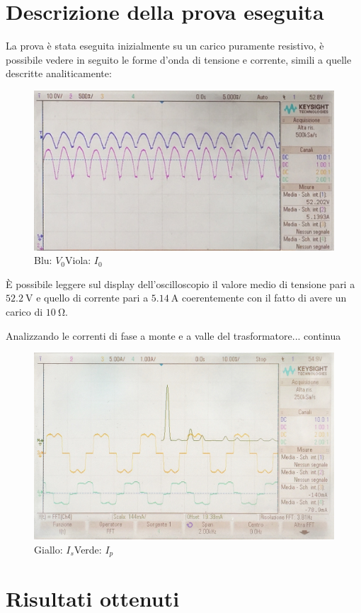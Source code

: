 \documentclass[a4paper,10pt]{article}
\begin{document}
\section{Descrizione della prova eseguita}
La prova è stata eseguita inizialmente su un carico puramente resistivo, 
è possibile vedere in seguito le forme d'onda di tensione e corrente, simili a quelle 
descritte analiticamente:
\begin{figure}[H]
\centering
 \includegraphics[keepaspectratio=true,width=0.9\linewidth]
 {tensione_e_corrente_2_neg.jpg}
 \caption{Blu: \(V_0\)\quad Viola: \(I_0\)}
 \label{fig:tensioni_carico_R}
\end{figure}
È possibile leggere sul display dell'oscilloscopio il valore medio di tensione pari
a $\SI{52.2}{\volt}$ e quello di corrente pari a $\SI{5.14}{\ampere}$ coerentemente
con il fatto di avere un carico di $\SI{10}{\ohm}$.

Analizzando le correnti di fase a monte e a valle del trasformatore... continua
\begin{figure}[H]
 \centering
 \includegraphics[keepaspectratio=true,width=0.9\linewidth]
 {correnti_FFT_2_neg.jpg}
 \caption{Giallo: \(I_s\)\quad Verde: \(I_p\)}
 \label{fig:correnti_fase_carico_R}
 \end{figure}


\section{Risultati ottenuti}
\end{document}
